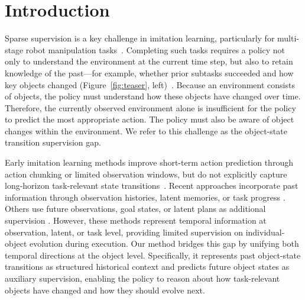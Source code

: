 \section{Introduction}
\label{sec:introduction}

Sparse supervision is a key challenge in imitation learning, particularly for multi-stage robot manipulation tasks~\citep{Zare2024Survey,Mandlekar2020Learning,Chen2023Sequential,Jain2025LongerHorizon}. Completing such tasks requires a policy not only to understand the environment at the current time step, but also to retain knowledge of the past---for example, whether prior subtasks succeeded and how key objects changed (Figure~\ref{fig:teaser}, left)~\citep{Kang2025Incorporating,Mark2026BPP}. Because an environment consists of objects, the policy must understand how these objects have changed over time. Therefore, the currently observed environment alone is insufficient for the policy to predict the most appropriate action. The policy must also be aware of object changes within the environment. We refer to this challenge as the object-state transition supervision gap.

Early imitation learning methods improve short-term action prediction through action chunking or limited observation windows, but do not explicitly capture long-horizon task-relevant state transitions~\citep{Zhao2023Learning, chi2024diffusionpolicy}. Recent approaches incorporate past information through observation histories, latent memories, or task progress \citep{Liang2021Finite, shi2025memoryvla, Mark2026BPP}. Others use future observations, goal states, or latent plans as additional supervision \citep{lynch2020play, Mandlekar2020Learning, belkhale2023plato}. However, these methods represent temporal information at observation, latent, or task level, providing limited supervision on individual-object evolution during execution. Our method bridges this gap by unifying both temporal directions at the object level. Specifically, it represents past object-state transitions as structured historical context and predicts future object states as auxiliary supervision, enabling the policy to reason about how task-relevant objects have changed and how they should evolve next.

